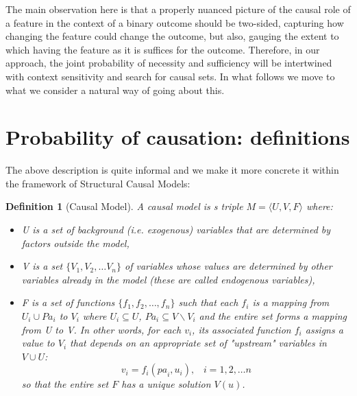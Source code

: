 \documentclass{article}
\newtheorem{definition}{Definition}
\begin{document}
The main observation here is that a properly nuanced picture of the causal role of a feature in the context of a binary outcome should be two-sided, capturing how changing the feature could change the outcome, but also, gauging the extent to which having the feature as it is suffices for the outcome. Therefore, in our approach, the joint probability of necessity and sufficiency will be intertwined with context sensitivity and search for causal sets.  In what follows we move to what we consider a natural way of going about this.















\section{Probability of causation: definitions}



The above description  is quite informal and we make it more concrete it within the framework of  Structural Causal Models:

\begin{definition}[Causal Model]
    A causal model is s triple \(M = \langle U, V, F \rangle\) where:
\begin{itemize}
    \item U is a set of background (i.e. exogenous) variables  that are determined by factors outside the model,
    \item V is a set \(\{V_1, V_2, \ldots V_n\}\) of  variables whose values are determined by other variables already in the model (these are called endogenous variables),
    \item F is a set of functions \(\{f_1, f_2, \ldots, f_n\}\) such that each \(f_i\) is a mapping from \(U_i \cup \mathit{Pa}_i\) to \(V_i\) where \(U_i \subseteq U\), \(\mathit{Pa}_i \subseteq V \backslash V_i\) and the entire set forms a mapping from U to V. In other words, for each $v_i$, its associated function  \(f_i\) 
    assigns a value to \(V_i\) that depends on an appropriate set of "upstream" variables in \(V \cup U\): \[v_i = f_i(\mathit{pa}_i, u_i), \;\;\; i = 1, 2, \ldots n\]
    so that the entire set \(F\) has a unique solution \(V(u)\).
\end{itemize}
\end{definition}
\end{document}
